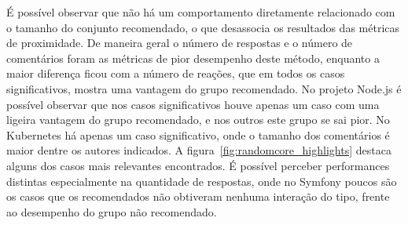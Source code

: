 \documentclass[12pt,openany,oneside,a4paper,english,brazil]{abntbibufjf}
\begin{document}
É possível observar que não há um comportamento diretamente relacionado com o tamanho do conjunto recomendado, o que desassocia os resultados das métricas de proximidade. De maneira geral o número de respostas e o número de comentários foram as métricas de pior desempenho deste método, enquanto a maior diferença ficou com a número de reações, que em todos os casos significativos, mostra uma vantagem do grupo recomendado. No projeto Node.js é possível observar que nos casos significativos houve apenas um caso com uma ligeira vantagem do grupo recomendado, e nos outros este grupo se sai pior. No Kubernetes há apenas um caso significativo, onde o tamanho dos comentários é maior dentre os autores indicados. A figura~\ref{fig:randomcore_highlights} destaca alguns dos casos mais relevantes encontrados. É possível perceber performances distintas especialmente na quantidade de respostas, onde no Symfony poucos são os casos que os recomendados não obtiveram nenhuma interação do tipo, frente ao desempenho do grupo não recomendado.
\end{document}
